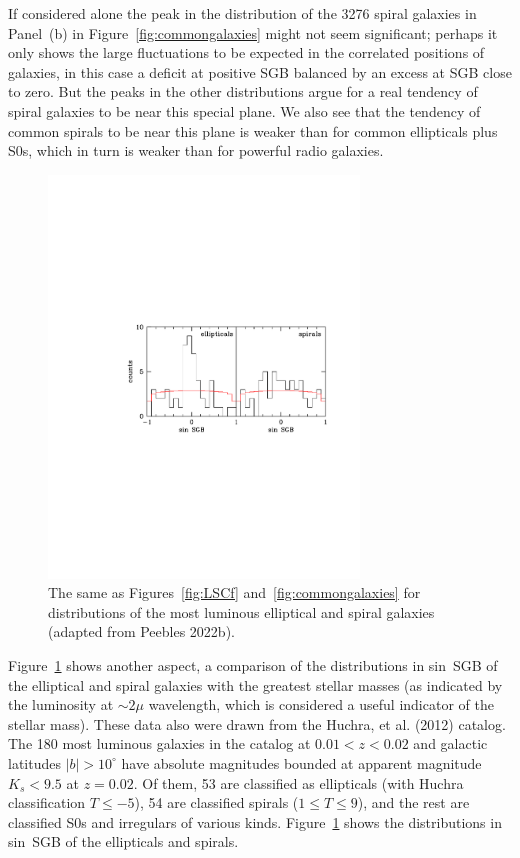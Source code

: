 \documentclass[fleqn,usenatbib]{mnras}
\begin{document}
If considered alone the peak in the distribution of the 3276 spiral galaxies in Panel~(b) in Figure~\ref{fig:commongalaxies} might not seem significant; perhaps it only shows the large fluctuations to be expected in the correlated positions of galaxies, in this case a deficit at positive SGB balanced by an excess at SGB close to zero. But the peaks in the other distributions argue for a real tendency of spiral galaxies to be near this special plane. We also see that the tendency of common spirals to be near this plane is weaker than for common ellipticals plus S0s, which in turn is weaker than for powerful radio galaxies. 

\begin{figure}
\begin{center}
\includegraphics[angle=0,width=3.25in]{morphologies.pdf} 
\caption{The same as Figures~\ref{fig:LSCf} and~\ref{fig:commongalaxies} for distributions of the most luminous elliptical and spiral galaxies (adapted from Peebles 2022b).}\label{fig:morphologies}
\end{center}
\end{figure}

Figure~\ref{fig:morphologies} shows another aspect, a  comparison of the distributions in sin~SGB of the elliptical and spiral galaxies with the greatest stellar masses (as indicated by the luminosity at $\sim 2\mu$ wavelength, which is considered a useful indicator of the stellar mass). These data also were drawn from the Huchra, et al. (2012) catalog. The 180 most luminous galaxies in the catalog at  $0.01<z<0.02$ and galactic latitudes $|b|>10^\circ$ have absolute magnitudes bounded at apparent magnitude $K_s < 9.5$ at $z=0.02$. Of them, 53 are classified as ellipticals (with Huchra classification $T\leq -5$), 54 are classified spirals ($1\leq T\leq 9$), and the rest are classified S0s and irregulars of various kinds. Figure~\ref{fig:morphologies}  shows the distributions in sin~SGB of the ellipticals and spirals.
\end{document}
